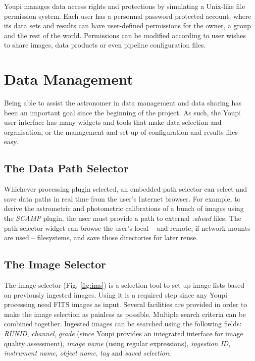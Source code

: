 \documentclass[11pt,twoside]{article}  %
\begin{document}
Youpi manages data access rights and protections by simulating a Unix-like file permission system. 
Each user has a personnal password protected account, where its data sets and results can have 
user-defined permissions for the owner, a group and the rest of the world. Permissions can be 
modified according to user wishes to share images, data products or even pipeline configuration 
files.

\section{Data Management}

Being able to assist the astronomer in data management and data sharing has been an important 
goal since the beginning of the project. As such, the Youpi user interface has many widgets 
and tools that make data selection and organisation, or the management and set up of configuration 
and results files easy.

\subsection{The Data Path Selector}

Whichever processing plugin selected, an embedded path selector can select and save data paths 
in real time from the user's Internet browser. For example, to derive the astrometric and photometric 
calibrations of a bunch of images using the \emph{SCAMP} plugin, the user must provide a path to 
external \emph{.ahead} files. The path selector widget can browse the user's local -- and remote, 
if network mounts are used -- filesystems, and save those directories for later reuse.

\subsection{The Image Selector}\label{sec:ims}

The image selector (Fig. \ref{fig:ims}) is a selection tool to set up image lists based on previously 
ingested images. Using it is a required step since any Youpi processing need FITS images as input. 
Several facilities are provided in order to make the image selection as painless as possible. 
Multiple search criteria can be combined together. Ingested images can be searched using the 
following fields: \emph{RUNID}, \emph{channel}, \emph{grade} (since Youpi provides an integrated 
interface for image quality assessment), \emph{image name} (using regular expressions), 
\emph{ingestion ID}, \emph{instrument name}, \emph{object name}, \emph{tag} and 
\emph{saved selection}.
\end{document}
